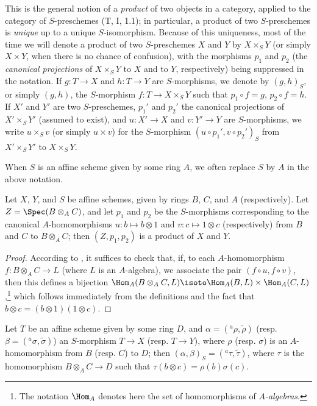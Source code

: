 This is the general notion of a \emph{product} of two objects in a category, applied
to the category of $S$-preschemes (T, I, 1.1); in particular, a product of two $S$-preschemes
is \emph{unique} up to a unique $S$-isomorphism. Because of this uniqueness, most of the time
we will denote a product of two $S$-preschemes $X$ and $Y$ by $X\times_S Y$ (or
simply $X\times Y$, when there is no chance of confusion), with the morphisms $p_1$ and $p_2$
(the \emph{canonical projections} of $X\times_S Y$ to $X$ and to $Y$, respectively) being suppressed
in the notation. If $g:T\to X$ and $h:T\to Y$ are $S$-morphisms, we denote by $(g,h)_S$, or
simply $(g,h)$, the $S$-morphism $f:T\to X\times_S Y$ such that $p_1\circ f=g$,
$p_2\circ f=h$. If $X'$ and $Y'$ are two $S$-preschemes, $p_1'$ and $p_2'$ the canonical
projections of $X'\times_S Y'$ (assumed to exist), and $u:X'\to X$ and
$v:Y'\to Y$ are $S$-morphisms, we write $u\times_S v$ (or simply $u\times v$)
for the $S$-morphism $(u\circ p_1',v\circ p_2')_S$ from $X'\times_S Y'$ to
$X\times_S Y$.

When $S$ is an affine scheme given by some ring $A$, we often replace $S$
by $A$ in the above notation.

\begin{proposition}[3.2.2]
\label{I.3.2.2}
Let $X$, $Y$, and $S$ be affine schemes, given by rings $B$, $C$, and $A$ (respectively). Let
$Z=\Spec(B\otimes_A C)$, and let $p_1$ and $p_2$ be the $S$-morphisms corresponding  to
the canonical $A$-homomorphisms $u:b\mapsto b\otimes 1$ and $v:c\mapsto 1\otimes c$ (respectively) from $B$
and $C$ to $B\otimes_A C$; then $(Z,p_1,p_2)$ is a product of $X$ and $Y$.
\end{proposition}

\begin{proof}
According to , it suffices to check that, if, to each $A$-homomorphism
$f:B\otimes_A C\to L$ (where $L$ is an $A$-algebra), we associate the pair
$(f\circ u,f\circ v)$, then this defines a bijection
$\Hom_A(B\otimes_A C,L)\isoto\Hom_A(B,L)\times\Hom_A(C,L)$,\footnote{The notation $\Hom_A$
denotes here the set of homomorphisms of \emph{$A$-algebras}.} which follows immediately
from the definitions and the fact that $b\otimes c=(b\otimes 1)(1\otimes c)$.
\end{proof}

\begin{corollary}[3.2.3]
\label{I.3.2.3}
Let $T$ be an affine scheme given by some ring $D$, and $\alpha=({}^a\rho,\widetilde{\rho})$
(resp. $\beta=({}^a\sigma,\widetilde{\sigma})$) an $S$-morphism $T\to X$ (resp. $T\to Y$),
where $\rho$ (resp. $\sigma$) is an $A$-homomorphism from $B$ (resp. $C$) to $D$; then
$(\alpha,\beta)_S=({}^a\tau,\widetilde{\tau})$, where $\tau$ is the homomorphism
$B\otimes_A C\to D$ such that $\tau(b\otimes c)=\rho(b)\sigma(c)$.
\end{corollary}

